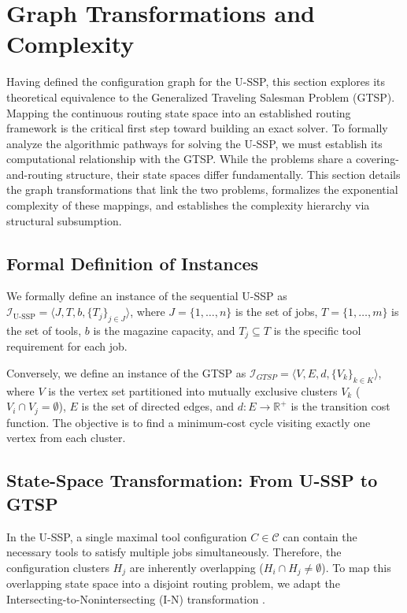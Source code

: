 \documentclass[12pt]{article}
\begin{document}
\section{Graph Transformations and Complexity}

Having defined the configuration graph for the U-SSP, this section explores its theoretical equivalence to the Generalized Traveling Salesman Problem (GTSP). Mapping the continuous routing state space into an established routing framework is the critical first step toward building an exact solver. To formally analyze the algorithmic pathways for solving the U-SSP, we must establish its computational relationship with the GTSP. While the problems share a covering-and-routing structure, their state spaces differ fundamentally. This section details the graph transformations that link the two problems, formalizes the exponential complexity of these mappings, and establishes the complexity hierarchy via structural subsumption.

\subsection{Formal Definition of Instances}
We formally define an instance of the sequential U-SSP as $\mathcal{I}_{\text{U-SSP}} = \langle J, T, b, \{T_j\}_{j \in J} \rangle$, where $J = \{1, \dots, n\}$ is the set of jobs, $T = \{1, \dots, m\}$ is the set of tools, $b$ is the magazine capacity, and $T_j \subseteq T$ is the specific tool requirement for each job.

Conversely, we define an instance of the GTSP as $\mathcal{I}_{GTSP} = \langle V, E, d, \{V_k\}_{k \in K} \rangle$, where $V$ is the vertex set partitioned into mutually exclusive clusters $V_k$ ($V_i \cap V_j = \emptyset$), $E$ is the set of directed edges, and $d: E \to \mathbb{R}^+$ is the transition cost function. The objective is to find a minimum-cost cycle visiting exactly one vertex from each cluster.

\subsection{State-Space Transformation: From U-SSP to GTSP}

In the U-SSP, a single maximal tool configuration $C \in \mathcal{C}$ can contain the necessary tools to satisfy multiple jobs simultaneously. Therefore, the configuration clusters $H_j$ are inherently overlapping ($H_i \cap H_j \neq \emptyset$). To map this overlapping state space into a disjoint routing problem, we adapt the Intersecting-to-Nonintersecting (I-N) transformation \citep{Lien1993}.
\end{document}
